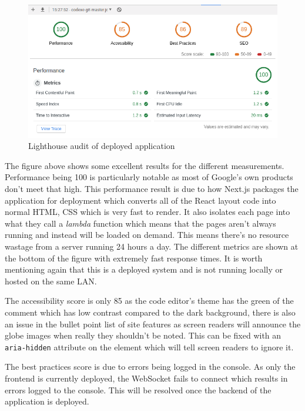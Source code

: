 \begin{figure}[h!]
    \centering
    \includegraphics[scale=0.5]{res/lighthouse_audit_deployed.png}
    \caption{Lighthouse audit of deployed application}
    \label{deployed-lighthouse}
\end{figure}

The figure above shows some excellent results for the different measurements. Performance being 100 is particularly notable as most of Google's own products don't meet that high. This performance result is due to how Next.js packages the application for deployment which converts all of the React layout code into normal HTML, CSS which is very fast to render. It also isolates each page into what they call a \textit{lambda} function which means that the pages aren't always running and instead will be loaded on demand. This means there's no resource wastage from a server running 24 hours a day. The different metrics are shown at the bottom of the figure with extremely fast response times. It is worth mentioning again that this is a deployed system and is not running locally or hosted on the same LAN.

The accessibility score is only 85 as the code editor's theme has the green of the comment which has low contrast compared to the dark background, there is also an issue in the bullet point list of site features as screen readers will announce the globe images when really they shouldn't be noted. This can be fixed with an \texttt{aria-hidden} attribute on the element which will tell screen readers to ignore it. 

The best practices score is due to errors being logged in the console. As only the frontend is currently deployed, the WebSocket fails to connect which results in errors logged to the console. This will be resolved once the backend of the application is deployed. 

